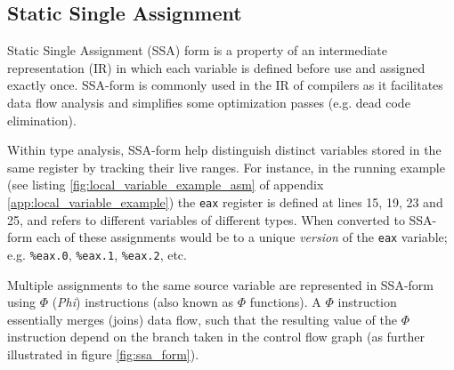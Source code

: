 
\subsection{Static Single Assignment}

Static Single Assignment (SSA) form is a property of an intermediate representation (IR) in which each variable is defined before use and assigned exactly once. SSA-form is commonly used in the IR of compilers as it facilitates data flow analysis and simplifies some optimization passes (e.g. dead code elimination).


Within type analysis, SSA-form help distinguish distinct variables stored in the same register by tracking their live ranges. For instance, in the running example (see listing \ref{fig:local_variable_example_asm} of appendix \ref{app:local_variable_example}) the \texttt{eax} register is defined at lines 15, 19, 23 and 25, and refers to different variables of different types. When converted to SSA-form each of these assignments would be to a unique \textit{version} of the \texttt{eax} variable; e.g. \texttt{\%eax.0}, \texttt{\%eax.1}, \texttt{\%eax.2}, etc.

Multiple assignments to the same source variable are represented in SSA-form using $\Phi$ (\textit{Phi}) instructions (also known as $\Phi$ functions). A $\Phi$ instruction essentially merges (joins) data flow, such that the resulting value of the $\Phi$ instruction depend on the branch taken in the control flow graph (as further illustrated in figure \ref{fig:ssa_form}).

